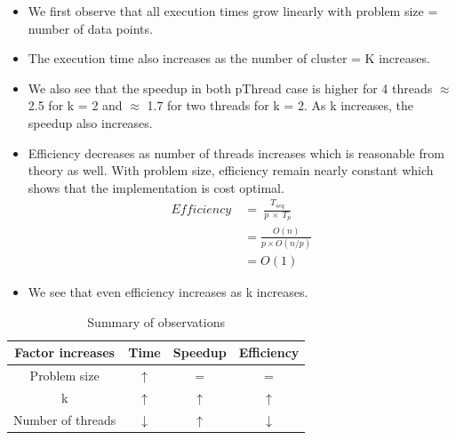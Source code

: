 \documentclass[letter, 11pt, margin=1in]{article}
\begin{document}
\begin{itemize}
    \item We first observe that all execution times grow linearly with problem size = number of data points.
    \item The execution time also increases as the number of cluster = K increases.
    \item We also see that the speedup in both pThread case is higher for 4 threads $\approx$ 2.5 for k = 2 and $\approx$ 1.7 for two threads for k = 2. As k increases, the speedup also increases.
    \item Efficiency decreases as number of threads increases which is reasonable from theory as well. With problem size, efficiency remain nearly constant which shows that the implementation is cost optimal. \\
    \begin{align*}
        Efficiency\ &=\ \frac{T_{seq}}{p\ \times\ T_p}\\
        &= \frac{O(n)}{p \times O(n/p)}\\
        &= O(1)
    \end{align*}
    \item We see that even efficiency increases as k increases.
\end{itemize}

\begin{table}[h]
    \centering
    \begin{tabular}{|c|c|c|c|}
    \hline
        Factor increases & Time & Speedup & Efficiency  \\ \hline \hline
        Problem size  & $\uparrow$ & = & = \\ \hline
        k & $\uparrow$ & $\uparrow$ & $\uparrow$ \\ \hline
        Number of threads & $\downarrow$ & $\uparrow$ & $\downarrow$ \\ \hline
    \end{tabular}
    \caption{Summary of observations}
    \label{tab:my_label}
\end{table}
\end{document}
